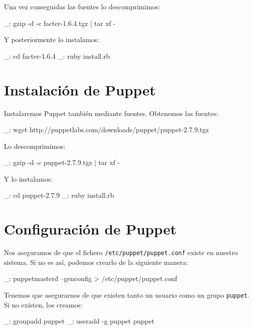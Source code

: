 Una vez conseguidas las fuentes lo descomprimimos:

\begin{bashcode}
_: gzip -d -c facter-1.6.4.tgz | tar xf -
\end{bashcode}

Y posteriormente lo instalamos:

\begin{bashcode}
_: cd facter-1.6.4
_: ruby install.rb
\end{bashcode}


\section{Instalación de Puppet}

Instalaremos Puppet también mediante fuentes. Obtenemos las fuentes:

\begin{bashcode}
_: wget http://puppetlabs.com/downloads/puppet/puppet-2.7.9.tgz
\end{bashcode}

Lo descomprimimos:

\begin{bashcode}
_: gzip -d -c puppet-2.7.9.tgz | tar xf -
\end{bashcode}

Y lo instalamos:

\begin{bashcode}
_: cd puppet-2.7.9
_: ruby install.rb
\end{bashcode}


\section{Configuración de Puppet}

Nos aseguramos de que el fichero \texttt{/etc/puppet/puppet.conf} existe en nuestro sistema. Si no es así, podemos crearlo de la siguiente manera:

\begin{bashcode}
_: puppetmasterd --genconfig > /etc/puppet/puppet.conf
\end{bashcode}

Tenemos que asegurarnos de que existen tanto un usuario como un grupo \texttt{puppet}. Si no existen, los creamos:

\begin{bashcode}
_: groupadd puppet
_: useradd -g puppet puppet
\end{bashcode}

